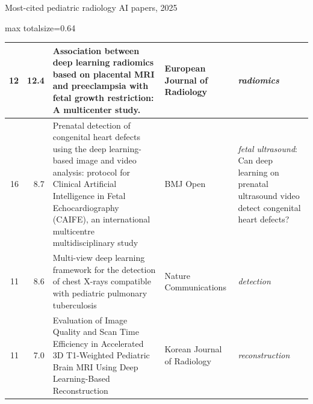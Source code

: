 \documentclass[aspectratio=169]{beamer}
\begin{document}
\begin{frame}[category=Journals/Preprints]{Most-cited pediatric radiology AI papers, 2025}
\begin{adjustbox}{max totalsize={\textwidth}{0.64\textheight}}
\begin{tabular}{|r|r|>{\raggedright\arraybackslash}p{}|>{\raggedright\arraybackslash}p{}|>{\raggedright\arraybackslash}p{}|}
12 & 12.4 & Association between deep learning radiomics based on placental MRI and preeclampsia with fetal growth restriction: A multicenter study. & European Journal of Radiology & \textit{radiomics} \\ \hline
16 & 8.7 & Prenatal detection of congenital heart defects using the deep learning-based image and video analysis: protocol for Clinical Artificial Intelligence in Fetal Echocardiography (CAIFE), an international multicentre multidisciplinary study & BMJ Open & \textit{fetal ultrasound}: Can deep learning on prenatal ultrasound video detect congenital heart defects? \\ \hline
11 & 8.6 & Multi-view deep learning framework for the detection of chest X-rays compatible with pediatric pulmonary tuberculosis & Nature Communications & \textit{detection} \\ \hline
11 & 7.0 & Evaluation of Image Quality and Scan Time Efficiency in Accelerated 3D T1-Weighted Pediatric Brain MRI Using Deep Learning-Based Reconstruction & Korean Journal of Radiology & \textit{reconstruction} \\ \hline
\end{tabular}
\end{adjustbox}
\\[1pt]
{\tiny }
\end{frame}
\end{document}
